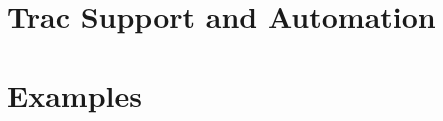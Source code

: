 \documentclass[10pt,DIV16,a4paper,abstract=true,twoside=semi,openright]
{scrreprt}
\begin{document}
\chapter{Trac Support and Automation}
\label{cha:trac}






\chapter{Examples}
\label{cha:examples}







% 


{\small
  
  
}
\end{document}
